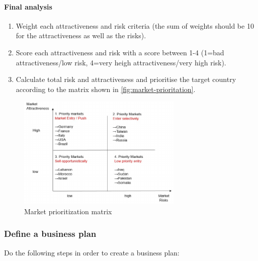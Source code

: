 \paragraph{Final analysis}

\begin{enumerate}
	\tightlist
	\item Weight each attractiveness and risk criteria (the sum of weights should be 10 for the attractiveness as well as the risks).
	\item Score each attractiveness and risk with a score between 1-4 (1=bad attractiveness/low risk, 4=very heigh attractiveness/very high risk).
	\item Calculate total risk and attractiveness and prioritise the target country according to the matrix shown in \autoref{fig:market-prioritation}.
\end{enumerate}

\begin{figure}[H]
	\centering
	\includegraphics[width=0.7\textwidth]{figures/marketPrioritization.png}
	\caption{Market prioritization matrix}
	\label{fig:market-prioritation}
\end{figure}

\subsubsection{Define a business plan}

Do the following steps in order to create a business plan:

